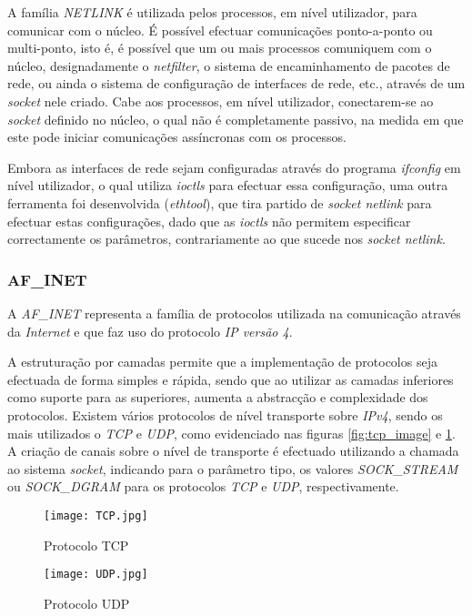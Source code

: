 A família \textit{NETLINK} é utilizada pelos processos, em nível utilizador, para comunicar com o núcleo.
É possível efectuar comunicações ponto-a-ponto ou multi-ponto, isto é, é possível que um ou mais processos comuniquem com o núcleo, designadamente o \textit{netfilter}, o sistema de encaminhamento de pacotes de rede, ou ainda o sistema de configuração de interfaces de rede, etc., através de um \textit{socket} nele criado.
Cabe aos processos, em nível utilizador, conectarem-se ao \textit{socket} definido no núcleo, o qual não é completamente passivo, na medida em que este pode iniciar comunicações assíncronas com os processos.

Embora as interfaces de rede sejam configuradas através do programa \textit{ifconfig} em nível utilizador, o qual utiliza \textit{ioctls} para efectuar essa configuração, uma outra ferramenta foi desenvolvida (\textit{ethtool}), que tira partido de \textit{socket netlink} para efectuar estas configurações, dado que as \textit{ioctls} não permitem especificar correctamente os parâmetros, contrariamente ao que sucede nos \textit{socket netlink}.

\subsubsection{AF\_INET}
\label{subsub:af_inet}

A \textit{AF\_INET} representa a família de protocolos utilizada na comunicação através da \textit{Internet} e que faz uso do protocolo \textit{IP versão 4}. %

A estruturação por camadas permite que a implementação de protocolos seja efectuada de forma simples e rápida, sendo que ao utilizar as camadas inferiores como suporte para as superiores, aumenta a abstracção e complexidade dos protocolos.\cite{TCP_IP}
Existem vários protocolos de nível transporte sobre \textit{IPv4}, sendo os mais utilizados o \textit{TCP} e \textit{UDP}, como evidenciado nas figuras \ref{fig:tcp_image} e \ref{fig:udp_image}.
A criação de canais sobre o nível de transporte é efectuado utilizando a chamada ao sistema \textit{socket}, indicando para o parâmetro tipo, os valores \textit{SOCK\_STREAM} ou \textit{SOCK\_DGRAM} para os protocolos \textit{TCP} e \textit{UDP}, respectivamente.

\begin{figure}[ht]
\begin{minipage}[b]{0.5\linewidth}
\centering
\texttt{[image: TCP.jpg]}
\caption{Protocolo TCP}
\label{fig:tcp_image}
\end{minipage}
\hspace{0.5cm}
\begin{minipage}[b]{0.5\linewidth}
\centering
\texttt{[image: UDP.jpg]}
\caption{Protocolo UDP}
\label{fig:udp_image}
\end{minipage}
\end{figure}

